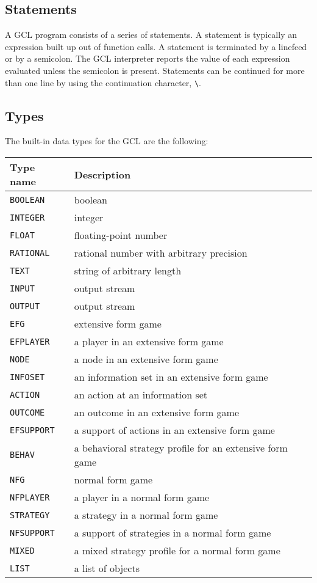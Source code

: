 \subsection{Statements}

A GCL program consists of a series of statements.  A statement is
typically an expression built up out of function calls.  A statement
is terminated by a linefeed or by a semicolon.  The GCL interpreter
reports the value of each expression evaluated unless the semicolon is
present. Statements can be continued for more than one line by using
the continuation character, \verb+\+.

\subsection{Types}

The built-in data types for the GCL are the following:

\medskip

\begin{tabular} {|l||l|} \hline
Type name	& Description \\ \hline
{\tt BOOLEAN} 	& boolean \\
{\tt INTEGER} 	& integer \\ 
{\tt FLOAT} 	& floating-point number \\
{\tt RATIONAL} 	& rational number with arbitrary precision \\
{\tt TEXT}	& string of arbitrary length \\
{\tt INPUT}	& output stream \\
{\tt OUTPUT}	& output stream \\ \hline
{\tt EFG}	& extensive form game \\
{\tt EFPLAYER}	& a player in an extensive form game \\
{\tt NODE}	& a node in an extensive form game \\ 
{\tt INFOSET}	& an information set in an extensive form game \\
{\tt ACTION}	& an action at an information set \\
{\tt OUTCOME}	& an outcome in an extensive form game \\
{\tt EFSUPPORT}	& a support of actions in an extensive form game \\
{\tt BEHAV}	& a behavioral strategy profile for an extensive form game \\ \hline
{\tt NFG}	& normal form game \\
{\tt NFPLAYER}	& a player in a normal form game \\
{\tt STRATEGY}	& a strategy in a normal form game \\
{\tt NFSUPPORT}	& a support of strategies in a normal form game \\
{\tt MIXED}	& a mixed strategy profile for a normal form game \\ \hline
{\tt LIST}	& a list of objects \\ \hline
\end{tabular}

